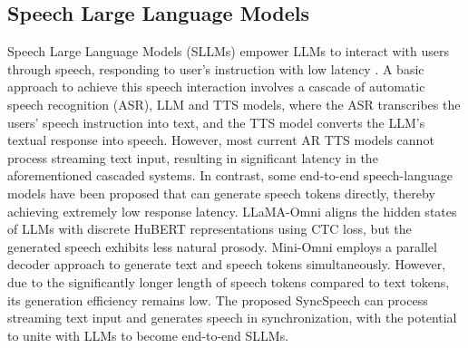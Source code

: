 \subsection{Speech Large Language Models}
Speech Large Language Models (SLLMs) empower LLMs to interact with users through speech, responding to user’s instruction with  low latency \cite{wavchat}.
A basic approach \cite{audiogpt} to achieve this speech interaction involves a cascade of automatic speech recognition (ASR), LLM and TTS models, where the ASR transcribes the users' speech instruction into text, and the TTS model converts the LLM's textual response into speech. 
However, most current AR TTS models  cannot process streaming text input, resulting in significant latency in the aforementioned cascaded systems. 
In contrast, some end-to-end speech-language models have been proposed that can generate speech tokens directly,   thereby achieving extremely low response latency. LLaMA-Omni \cite{llamaomni} aligns the hidden states of LLMs with discrete HuBERT \cite{hubert} representations using CTC loss, but the generated speech exhibits less natural prosody. Mini-Omni \cite{mini1} employs a parallel decoder approach to generate text and speech tokens simultaneously. 
However, due to the significantly longer length of speech tokens compared to text tokens, its generation efficiency remains low. 
The proposed SyncSpeech can process streaming text input and generates speech in synchronization, with the potential to unite with LLMs to become end-to-end SLLMs.  
